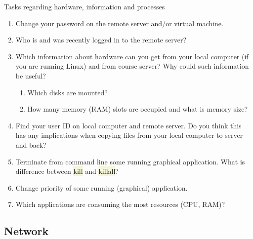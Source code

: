 \documentclass[compress, ucs, xelatex, 11pt, xcolor=svgnames, aspectratio=169,
	hyperref={
		bookmarks=true,
		unicode=true,
		colorlinks=true,
		pdftitle={Linux, command line and MetaCentrum},
		plainpages=false,
		pdfauthor={Vojtech Zeisek},
		pdfsubject={Course about use of Linux command line, writing shell scripts and using MetaCentrum of CESNET},
		pdfcreator={XeLaTeX},
		pdfkeywords={Linux, GNU, BASH, shell, command line, MetaCentrum},
		linkcolor=DarkRed, %
		anchorcolor=DarkBlue, %
		citecolor=Indigo, %
		filecolor=NavyBlue, %
		menucolor=DarkMagenta, %
		urlcolor=DarkBlue, %
		pdftex},
	url={hyphens, lowtilde} %
	]{beamer}
\renewcommand{\texttt}[1]{\colorbox{Beige}{{\ttfamily #1}}}
\begin{document}
\begin{frame}{Tasks regarding hardware, information and processes}
	\begin{enumerate}
		\item Change your password on the remote server and/or virtual machine.
		\item Who is and was recently logged in to the remote server?
		\item Which information about hardware can you get from your local computer (if you are running Linux) and from course server? Why could such information be useful?
	\begin{enumerate}
		\item Which disks are mounted?
		\item How many memory (RAM) slots are occupied and what is memory size?
	\end{enumerate}
	\item Find your user ID on local computer and remote server. Do you think this has any implications when copying files from your local computer to server and back?
	\item Terminate from command line some running graphical application. What is difference between \texttt{kill} and \texttt{killall}?
	\item Change priority of some running (graphical) application.
	\item Which applications are consuming the most resources (CPU, RAM)?
	\end{enumerate}
\end{frame}

\subsection{Network}
\end{document}

